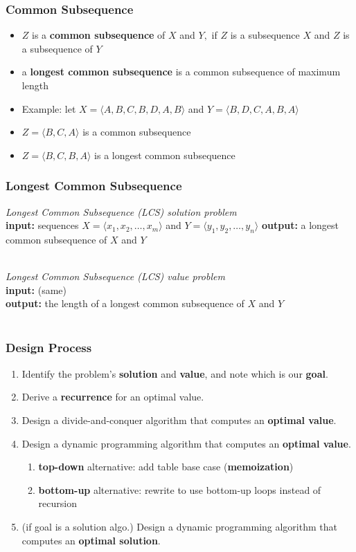 \documentclass[10pt,aspectratio=169]{beamer}
\newcommand{\stanza}{ \\~\ }
\begin{document}
\begin{frame} \frametitle{Common Subsequence}
  \begin{itemize}
  \item $Z$ is a \textbf{common subsequence} of $X$ and $Y,$ if $Z$ is a subsequence $X$ and $Z$ is a subsequence of $Y$
  \item a \textbf{longest common subsequence} is a common subsequence of maximum length
  \item Example: let $X=\langle A, B, C, B, D, A, B \rangle $  and $Y=\langle B, D, C, A, B, A \rangle$ 
  \item $Z=\langle B, C, A \rangle$ is a common subsequence
  \item $Z=\langle B, C, B, A \rangle$ is a longest common subsequence
  \end{itemize}
\end{frame}

\begin{frame} \frametitle{Longest Common Subsequence}

  \emph{Longest Common Subsequence (LCS) solution problem} \\
  \textbf{input:} sequences $X=\langle x_1, x_2, \ldots, x_m \rangle$ and $Y=\langle y_1, y_2, \ldots, y_n \rangle$
  \textbf{output:} a longest common subsequence of $X$ and $Y$ \stanza
  
  \emph{Longest Common Subsequence (LCS) value problem} \\
  \textbf{input:} (same) \\
  \textbf{output:} the length of a longest common subsequence of $X$ and $Y$ \stanza

\end{frame}

\begin{frame} \frametitle{Design Process}
  \begin{enumerate}
    \item Identify the problem's \textbf{solution} and \textbf{value}, and note which is our \textbf{goal}.
    \item Derive a \textbf{recurrence} for an optimal value.
    \item Design a divide-and-conquer algorithm that computes an \textbf{optimal value}.
    \item Design a dynamic programming algorithm that computes an \textbf{optimal value}.
    \begin{enumerate}
      \item \textbf{top-down} alternative: add table base case (\textbf{memoization})
      \item \textbf{bottom-up} alternative: rewrite to use bottom-up loops instead of recursion
    \end{enumerate}
    \item (if goal is a solution algo.) Design a dynamic programming algorithm that computes an \textbf{optimal solution}.
  \end{enumerate}
  \end{frame}
\end{document}
